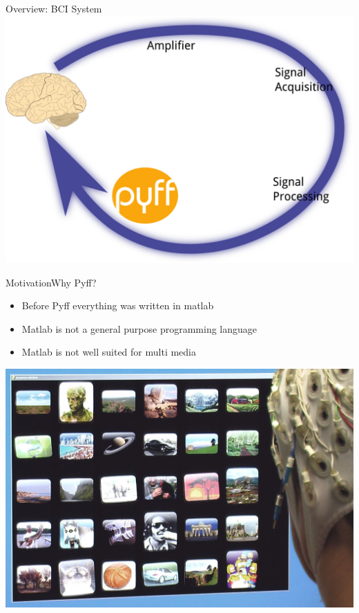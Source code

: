 \documentclass{beamer}
\begin{document}
\begin{frame}{Overview: BCI System}
    \includegraphics[width=\linewidth]{bci_system_w_pyff}
\end{frame}

\begin{frame}{Motivation}{Why Pyff?}
    \begin{itemize}
        \item Before Pyff everything was written in matlab
        \item Matlab is not a general purpose programming language
        \item Matlab is not well suited for multi media
    \end{itemize}
    \vfill
    \begin{center}
        \includegraphics[width=.6\linewidth]{fotobrowser}
    \end{center}
\end{frame}
\end{document}
